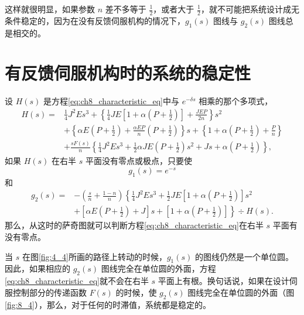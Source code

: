 这样就很明显，如果参数 $ n $ 差不多等于 $ \frac{1}{2} $，或者大于 $ \frac{1}{2} $，就不可能把系统设计成无条件稳定的，因为在没有反馈伺服机构的情况下，$ g_1(s) $ 图线与 $ g_2(s) $ 图线总是相交的。



\section{有反馈伺服机构时的系统的稳定性}

设 $ H(s) $ 是方程\eqref{eq:ch8_characteristic_eq}中与 $ e^{-\delta s} $ 相乘的那个多项式，
\begin{equation}\label{eq:ch8_Hs}
\begin{aligned}
H(s) = &\frac{1}{4} J^2 E s^3 + \left\{ \frac{1}{4} J E \left[ 1 + \alpha \left( P + \frac{1}{2} \right) \right] + \frac{JEP}{2n} \right\} s^2 \\
&+ \left\{ \alpha E \left( P + \frac{1}{2} \right) + \frac{\alpha EP}{n} \left( P + \frac{1}{2} \right) \right\} s + \left\{ 1 + \alpha \left( P + \frac{1}{2} \right) + \frac{P}{n} \right\} \\
&+ \frac{sF(s)}{n} \left\{ \frac{1}{4} J^2 E s^3 + \frac{1}{2} \alpha J E \left( P + \frac{1}{2} \right) s^2 + Js + \alpha \left( P + \frac{1}{2} \right) \right\},
\end{aligned}
\end{equation}
如果 $ H(s) $ 在右半 $ s $ 平面没有零点或极点，只要使
\begin{equation*}
g_1(s) = e^{-s}
\end{equation*}
和
\begin{equation}\label{eq:ch8_g2_with_feedback}
\begin{aligned}
g_2(s) = &-\left( \frac{s}{n} + \frac{1-n}{n} \right) \left\{ \frac{1}{4} J^2 E s^3 + \frac{1}{2} J E \left[ 1 + \alpha \left( P + \frac{1}{2} \right) \right] s^2 \right. \\
&\left. + \left[ \alpha E \left( P + \frac{1}{2} \right) + J \right] s + \left[ 1 + \alpha \left( P + \frac{1}{2} \right) \right] \right\} \div H(s).
\end{aligned}
\end{equation}
那么，从这时的萨奇图就可以判断方程\eqref{eq:ch8_characteristic_eq}在右半 $ s $ 平面有没有零点。

当 $ s $ 在图\ref{fig:4_4}所画的路径上转动的时候，$ g_1(s) $ 的图线仍然是一个单位圆。因此，如果相应的 $ g_2(s) $ 图线完全在单位圆的外面，方程\eqref{eq:ch8_characteristic_eq}就不会在右半 $ s $ 平面上有根。换句话说，如果在设计伺服控制部分的传递函数 $ F(s) $ 的时候，使 $ g_2(s) $ 图线完全在单位圆的外面（图\ref{fig:8_4}），那么，对于任何的时滞值，系统都是稳定的。

